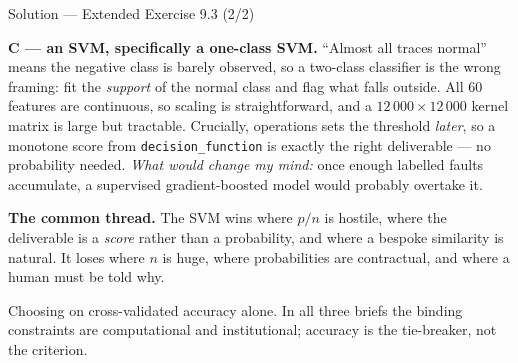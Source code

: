 \documentclass[aspectratio=169,11pt]{beamer}
\begin{document}
\begin{frame}{Solution --- Extended Exercise 9.3 (2/2)}
\begin{solutionbox}
  \scriptsize
  \textbf{C --- an SVM, specifically a one-class SVM.} ``Almost all traces
  normal'' means the negative class is barely observed, so a two-class
  classifier is the wrong framing: fit the \emph{support} of the normal class
  and flag what falls outside. All $60$ features are continuous, so scaling is
  straightforward, and a $12\,000\times12\,000$ kernel matrix is large but
  tractable. Crucially, operations sets the threshold \emph{later}, so a
  monotone score from \texttt{decision\_function} is exactly the right
  deliverable --- no probability needed. \emph{What would change my mind:} once
  enough labelled faults accumulate, a supervised gradient-boosted model would
  probably overtake it.

  \textbf{The common thread.} The SVM wins where $p/n$ is hostile, where the
  deliverable is a \emph{score} rather than a probability, and where a bespoke
  similarity is natural. It loses where $n$ is huge, where probabilities are
  contractual, and where a human must be told why.
\end{solutionbox}
\begin{mistake}
  Choosing on cross-validated accuracy alone. In all three briefs the binding
  constraints are computational and institutional; accuracy is the tie-breaker,
  not the criterion.
\end{mistake}
\end{frame}
\end{document}
